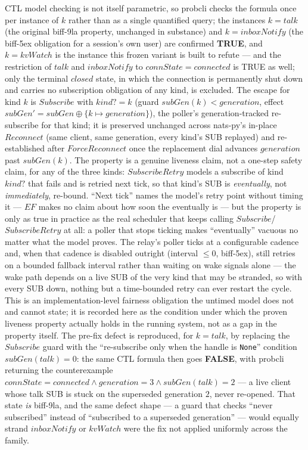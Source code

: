 \documentclass[a4paper,10pt,fleqn]{article}
\begin{document}
\begin{enumerate}
    CTL model checking is not itself parametric, so probcli checks the
    formula once per instance of $k$ rather than as a single quantified
    query; the instances $k = talk$ (the original biff-9la
    property, unchanged in substance) and $k = inboxNotify$ (the biff-5ex
    obligation for a session's own user) are confirmed \textbf{TRUE}, and
    $k = kvWatch$ is the instance this frozen variant is built to refute
    --- and the restriction of $talk$ and $inboxNotify$ to
    $connState = connected$ is TRUE as well; only the terminal $closed$
    state, in which the connection is permanently shut down and carries
    no subscription obligation of any kind, is excluded.  The escape for
    kind $k$ is $Subscribe$ with $kind? = k$ (guard $subGen(k) <
    generation$, effect $subGen' = subGen \oplus \{ k \mapsto generation
    \}$), the poller's generation-tracked re-subscribe for that kind; it
    is preserved unchanged across nats-py's in-place $Reconnect$ (same
    client, same generation, every kind's SUB replayed) and
    re-established after $ForceReconnect$ once the replacement dial
    advances $generation$ past $subGen(k)$.  The property is a genuine
    liveness claim, not a one-step safety claim, for any of the three
    kinds: $SubscribeRetry$ models a subscribe of kind $kind?$ that fails
    and is retried next tick, so that kind's SUB is \emph{eventually},
    not \emph{immediately}, re-bound.  ``Next tick'' names the model's
    retry point without timing it --- $EF$ makes no claim about how soon
    the eventually is --- but the property is only as true in practice as
    the real scheduler that keeps calling $Subscribe$/$SubscribeRetry$ at
    all: a poller that stops ticking makes ``eventually'' vacuous no
    matter what the model proves.  The relay's poller ticks at a
    configurable cadence and, when that cadence is disabled outright
    (interval $\leq 0$, biff-5ex), still retries on a bounded fallback
    interval rather than waiting on wake signals alone --- the wake path
    depends on a live SUB of the very kind that may be stranded, so with
    every SUB down, nothing but a time-bounded retry can ever restart the
    cycle.  This is an implementation-level fairness obligation the
    untimed model does not and cannot state; it is recorded here as the
    condition under which the proven liveness property actually holds in
    the running system, not as a gap in the property itself.  The pre-fix
    defect is reproduced,
    for $k = talk$, by replacing the $Subscribe$ guard with the
    ``re-subscribe only when the handle is \texttt{None}'' condition
    $subGen(talk) = 0$: the same CTL formula then goes \textbf{FALSE},
    with probcli returning the counterexample $connState = connected
    \land generation = 3 \land subGen(talk) = 2$ --- a live client whose
    talk SUB is stuck on the superseded generation $2$, never re-opened.
    That state \emph{is} biff-9la, and the same defect shape --- a guard
    that checks ``never subscribed'' instead of ``subscribed to a
    superseded generation'' --- would equally strand $inboxNotify$ or
    $kvWatch$ were the fix not applied uniformly across the family.


\end{enumerate}
\end{document}
